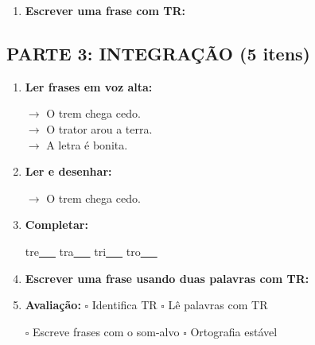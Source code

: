 \begin{exercicio}
\begin{enumerate}[resume]
  \item \textbf{Escrever uma frase com TR:}
  \begin{center}
  \underline{\hspace{12cm}}
  \end{center}

\end{enumerate}

\subsection*{PARTE 3: INTEGRAÇÃO (5 itens)}

\begin{enumerate}[resume]

  \item \textbf{Ler frases em voz alta:}
  \begin{center}
  $\rightarrow$ O trem chega cedo.\\
  $\rightarrow$ O trator arou a terra.\\
  $\rightarrow$ A letra é bonita.\\
  \end{center}

  \item \textbf{Ler e desenhar:}
  \begin{center}
  $\rightarrow$ O trem chega cedo.
  \end{center}
  \begin{center}
  \end{center}

  \item \textbf{Completar:}
  \begin{center}
  tre\underline{~~~} \quad tra\underline{~~~} \quad tri\underline{~~~} \quad tro\underline{~~~}
  \end{center}

  \item \textbf{Escrever uma frase usando duas palavras com TR:}
  \begin{center}
  \underline{\hspace{12cm}}
  \end{center}

  \item \textbf{Avaliação:} $\square$ Identifica TR \quad $\square$ Lê palavras com TR
  \begin{center}
  $\square$ Escreve frases com o som-alvo \quad $\square$ Ortografia estável
  \end{center}


\end{enumerate}
\end{exercicio}
